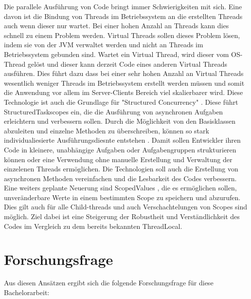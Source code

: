 Die parallele Ausführung von Code bringt immer Schwierigkeiten mit sich. 
Eine davon ist die Bindung von Threads im Betriebssystem an die erstellten Threads auch wenn dieser nur wartet. Bei einer hohen Anzahl an Threads kann dies schnell zu einem Problem werden.
Virtual Threads \cite{oracle21VritualThreads} sollen dieses Problem lösen, indem sie von der JVM verwaltet werden und nicht an Threads im Betriebssystem gebunden sind.
Wartet ein Virtual Thread, wird dieser vom OS-Thread gelöst und dieser kann derzeit Code eines anderen Virtual Threads ausführen.
Dies führt dazu dass bei einer sehr hohen Anzahl an Virtual Threads wesentlich weniger Threads im Betriebssystem erstellt werden müssen und somit die Anwendung vor allem im Server-Clients Bereich
viel skalierbarer wird.
Diese Technologie ist auch die Grundlage für "Structured Concurrency" \cite{structuredConcurrency}. Diese führt StructuredTaskscopes ein,
die die Ausführung von asynchronen Aufgaben erleichtern und verbessern sollen.
Durch die Möglichkeit von den Basisklassen abzuleiten und einzelne Methoden zu überschreiben, können so stark individualiesierte Ausführungsdiesnte entstehen \cite{AsyncStructuredConcurrency}.
Damit sollen Entwickler ihren Code in kleinere, unabhängige Aufgaben oder Aufgabengruppen strukturieren können oder eine Verwendung ohne manuelle Erstellung
und Verwaltung der einzelenen Threads ermöglichen.
Die Technologien soll auch die Erstellung von asynchronen Methoden vereinfachen und die Lesbarkeit des Codes verbessern.
Eine weiters geplante Neuerung sind ScopedValues \cite{JEP481}, die es ermöglichen sollen, unveränderbare Werte in einem bestimmten Scope zu speichern und abzurufen.
Dies gilt auch für alle Child-threads und auch Verschachtelungen von Scopes sind möglich.
Ziel dabei ist eine Steigerung der Robustheit und Verständlichkeit des Codes im Vergleich zu dem bereits bekannten ThreadLocal.






\section{Forschungsfrage}

Aus diesen Ansätzen ergibt sich die folgende Forschungsfrage für diese
Bachelorarbeit:
%


